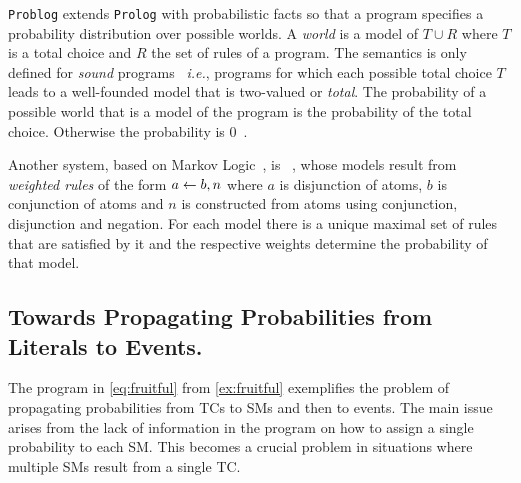 \documentclass[x11names]{tlp}
\renewcommand{\cite}{\citep}
\begin{document}
\texttt{Problog} \cite{fierens2015inference,verreet2022inference}
extends \texttt{Prolog} with probabilistic facts so that a program
specifies a probability distribution over possible worlds.  A
\textit{world} is a model of $T \cup R$ where $T$ is a total
choice and $R$ the set of rules of a program.  The semantics is only
defined for \textit{sound} programs~\cite{riguzzi2013well}
\textit{i.e.}, programs for which each possible total choice $T$
leads to a well-founded model that is two-valued or \textit{total}.
The probability of a possible world that is a model of the program is
the probability of the total choice.  Otherwise the probability is
$0$~\cite{riguzzi2013well,van1991well}.

Another system, based on Markov Logic~\cite{richardson2006markov}, is
\lpmln~\cite{lee2016weighted,lee2017lpmln}, whose models result from
\textit{weighted rules} of the form $a \leftarrow b, n$ where $a$ is disjunction
of atoms, $b$ is conjunction of atoms and $n$ is constructed from atoms using
conjunction, disjunction and negation. For each model there is a unique
maximal set of rules that are satisfied by it and the respective weights
determine the probability of that model.

\subsection*{Towards Propagating Probabilities from Literals to Events.}
\label{ssec:propagating.probabilities}

The program in \cref{eq:fruitful} from \cref{ex:fruitful} exemplifies the
problem of propagating probabilities from \aclp{TC} to \aclp{SM} and then to
events. The main issue arises from the lack of information in the program on
how to assign a single probability to each \acl{SM}. This becomes a crucial
problem in situations where multiple \aclp{SM} result from a single \acl{TC}.
\end{document}
